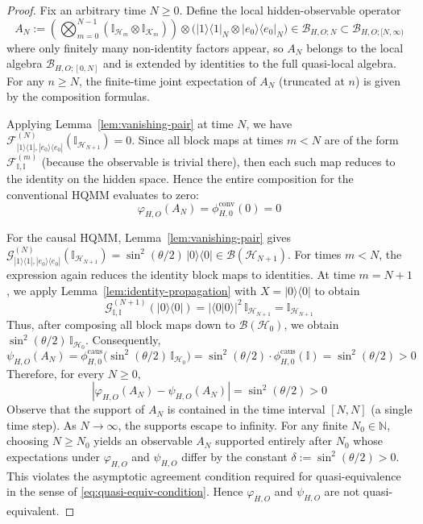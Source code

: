 \documentclass[11pt, reco]{article}
\begin{document}
\begin{proof}
Fix an arbitrary time $N \ge 0$. Define the local hidden-observable operator
\[
A_N := \left(\bigotimes_{m=0}^{N-1} (\mathbb{I}_{\mathcal{H}_m} \otimes \mathbb{I}_{\mathcal{K}_m})\right) \otimes \bigl( |1\rangle\langle 1|_N \otimes |e_0\rangle\langle e_0|_N \bigr) \in \mathcal{B}_{H,O; N}\subset \mathcal{B}_{H,O;[N,\infty)}
\]
where only finitely many non-identity factors appear, so $A_N$ belongs to the local algebra $\mathcal{B}_{H,O;[0,N]}$ and is extended by identities to the full quasi-local algebra. For any $n \ge N$, the finite-time joint expectation of $A_N$ (truncated at $n$) is given by the composition formulas.

Applying Lemma~\ref{lem:vanishing-pair} at time $N$, we have $\mathcal{F}^{(N)}_{|1\rangle\langle 1|, |e_0\rangle\langle e_0|}(\mathbb{I}_{\mathcal{H}_{N+1}}) = 0$. Since all block maps at times $m < N$ are of the form $\mathcal{F}^{(m)}_{\mathbb{I},\mathbb{I}}$ (because the observable is trivial there), then each such map reduces to the identity on the hidden space. Hence the entire composition for the conventional HQMM evaluates to zero:
\[
\varphi_{H,O}(A_N) = \phi_{H,0}^{\mathrm{conv}}(0) = 0
\]

For the causal HQMM, Lemma~\ref{lem:vanishing-pair} gives $\mathcal{G}^{(N)}_{|1\rangle\langle 1|, |e_0\rangle\langle e_0|}(\mathbb{I}_{\mathcal{H}_{N+1}}) = \sin^2(\theta/2) \, |0\rangle\langle 0| \in \mathcal{B}(\mathcal{H}_{N+1})$. For times $m < N$,  the expression again reduces the identity block maps to identities. At time $m = N+1$, we apply Lemma~\ref{lem:identity-propagation} with $X = |0\rangle\langle 0|$ to obtain
\[
\mathcal{G}^{(N+1)}_{\mathbb{I},\mathbb{I}}(|0\rangle\langle 0|) = |\langle 0|0\rangle|^2 \, \mathbb{I}_{\mathcal{H}_{N+1}} = \mathbb{I}_{\mathcal{H}_{N+1}}
\]
Thus, after composing all block maps down to $\mathcal{B}(\mathcal{H}_0)$, we obtain $\sin^2(\theta/2) \, \mathbb{I}_{\mathcal{H}_0}$. Consequently,
\[
\psi_{H,O}(A_N) = \phi_{H,0}^{\mathrm{caus}}\bigl( \sin^2(\theta/2) \, \mathbb{I}_{\mathcal{H}_0} \bigr) = \sin^2(\theta/2) \cdot \phi_{H,0}^{\mathrm{caus}}(\mathbb{I}) = \sin^2(\theta/2) > 0
\]
Therefore, for every $N \ge 0$,
\[
|\varphi_{H,O}(A_N) - \psi_{H,O}(A_N)| = \sin^2(\theta/2) > 0
\]
Observe that the support of $A_N$ is contained in the time interval $[N, N]$ (a single time step). As $N \to \infty$, the supports escape to infinity. For any finite $N_0 \in \mathbb{N}$, choosing $N \ge N_0$ yields an observable $A_N$ supported entirely after $N_0$ whose expectations under $\varphi_{H,O}$ and $\psi_{H,O}$ differ by the constant $\delta:= \sin^2(\theta/2) > 0$. This violates the asymptotic agreement condition required for quasi-equivalence in the sense of \eqref{eq:quasi-equiv-condition}. Hence $\varphi_{H,O}$ and $\psi_{H,O}$ are not quasi-equivalent.
\end{proof}
 
\end{document}
